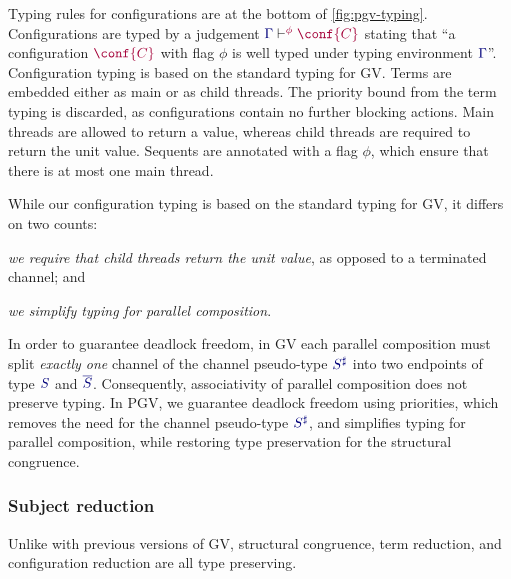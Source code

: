 \documentclass[main.tex]{subfiles}
\begin{document}
Typing rules for configurations are at the bottom of \cref{fig:pgv-typing}. Configurations are typed by a judgement $\cseq[\phi]{\ty{\Gamma}}{\conf{C}}$ stating that ``a configuration $\tm{\conf{C}}$ with flag $\phi$ is well typed under typing environment $\ty{\Gamma}$''. Configuration typing is based on the standard typing for GV. Terms are embedded either as main or as child threads. The priority bound from the term typing is discarded, as configurations contain no further blocking actions. Main threads are allowed to return a value, whereas child threads are required to return the unit value. Sequents are annotated with a flag $\phi$, which ensure that there is at most one main thread.

While our configuration typing is based on the standard typing for GV, it differs on two counts:
\begin{enumerate*}[label=(\roman*)]
\item \emph{we require that child threads return the unit value}, as opposed to a terminated channel; and
\item \emph{we simplify typing for parallel composition}.
\end{enumerate*}
In order to guarantee deadlock freedom, in GV each parallel composition must split \emph{exactly one} channel of the channel pseudo-type $\ty{S^\sharp}$ into two endpoints of type $\ty{S}$ and $\ty{\co{S}}$. Consequently, associativity of parallel composition does not preserve typing. In PGV, we guarantee deadlock freedom using priorities, which removes the need for the channel pseudo-type $\ty{S^\sharp}$, and simplifies typing for parallel composition, while restoring type preservation for the structural congruence.


\subsubsection*{Subject reduction}
Unlike with previous versions of GV, structural congruence, term reduction, and configuration reduction are all type preserving.
\end{document}
